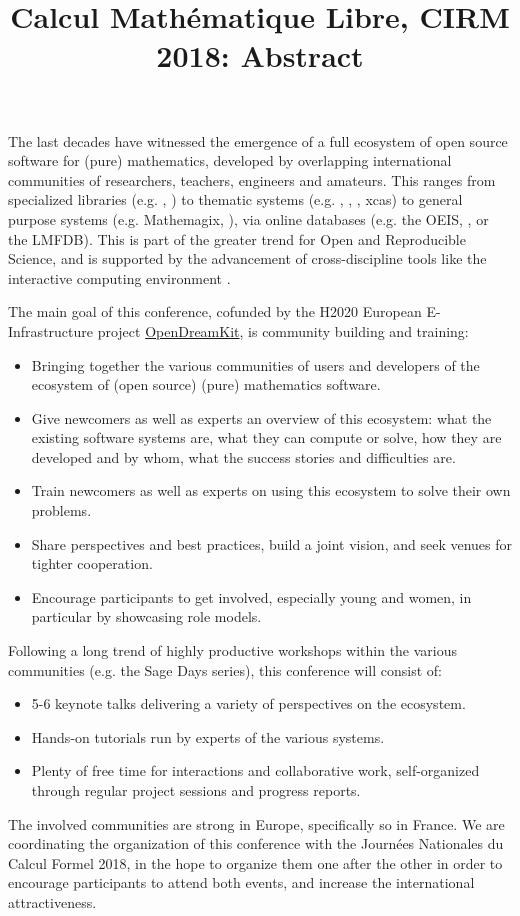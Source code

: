 \documentclass[12pt]{amsbook}
\begin{document}
\title{Calcul Mathématique Libre, CIRM 2018: Abstract}
\maketitle
The last decades have witnessed the emergence of a full ecosystem of
open source software for (pure) mathematics, developed by overlapping
international communities of researchers, teachers, engineers and
amateurs. This ranges from specialized libraries (e.g. \MPIR, \Linbox)
to thematic systems (e.g. \GAP, \Pari, \Singular, xcas) to general
purpose systems (e.g. Mathemagix, \Sage), via online databases
(e.g. the OEIS, \MathHub, or the LMFDB). This is part of the greater
trend for Open and Reproducible Science, and is supported by the
advancement of cross-discipline tools like the interactive computing
environment \Jupyter.


The main goal of this conference, cofunded by the H2020 European
E-Infrastructure project \href{opendreamkit.org}{OpenDreamKit}, is
community building and training:
\begin{itemize}
\item Bringing together the various communities of users and
  developers of the ecosystem of (open source) (pure) mathematics
  software.
\item Give newcomers as well as experts an overview of this ecosystem:
  what the existing software systems are, what they can compute or solve, how
  they are developed and by whom, what the success stories and
  difficulties are.
\item Train newcomers as well as experts on using this ecosystem to
  solve their own problems.
\item Share perspectives and best practices, build a joint vision, and
  seek venues for tighter cooperation.
\item Encourage participants to get involved, especially young and
  women, in particular by showcasing role models.
\end{itemize}


Following a long trend of highly productive workshops within the
various communities (e.g. the Sage Days series), this conference will consist of:
\begin{itemize}
\item 5-6 keynote talks delivering a variety of perspectives on the
  ecosystem.
\item Hands-on tutorials run by experts of the various systems.
\item Plenty of free time for interactions and collaborative work,
  self-organized through regular project sessions and progress
  reports.
\end{itemize}

The involved communities are strong in Europe, specifically so in
France. We are coordinating the organization of this conference with the Journées
Nationales du Calcul Formel 2018, in the hope to organize them one
after the other in order to encourage participants to attend both
events, and increase the international attractiveness.
\end{document}
